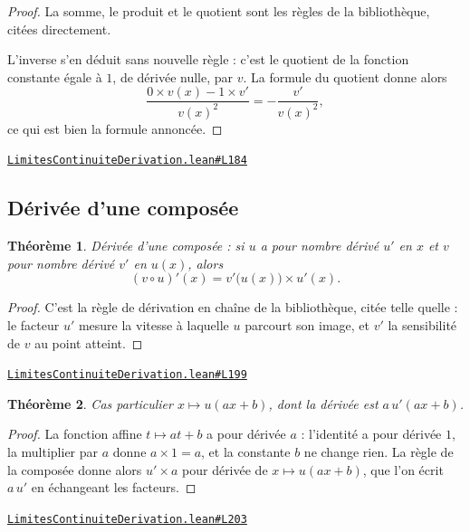\documentclass[11pt,a4paper]{article}
\theoremstyle{definition}
\theoremstyle{plain}
\newtheorem{theoreme}{Théorème}
\newcommand{\source}[2]{\par\smallskip\noindent\hfill{\footnotesize\href{#1}{\texttt{#2}}}\par\smallskip}
\begin{document}
\begin{proof}
La somme, le produit et le quotient sont les règles de la bibliothèque, citées
directement.

L'inverse s'en déduit sans nouvelle règle : c'est le quotient de la fonction constante
égale à $1$, de dérivée nulle, par $v$. La formule du quotient donne alors
\[ \frac{0 \times v(x) - 1 \times v'}{v(x)^{2}} = -\frac{v'}{v(x)^{2}} , \]
ce qui est bien la formule annoncée.
\end{proof}
\source{https://github.com/Commutator-IO/learn-lean/blob/main/cours/02-lycee/04-limites-continuite-derivation/LimitesContinuiteDerivation.lean\#L184}{LimitesContinuiteDerivation.lean\#L184}

\subsection{Dérivée d'une composée}

\begin{theoreme}
Dérivée d'une composée : si $u$ a pour nombre dérivé $u'$ en $x$ et $v$ pour nombre
dérivé $v'$ en $u(x)$, alors
\[ (v \circ u)'(x) = v'\bigl(u(x)\bigr) \times u'(x) . \]
\end{theoreme}

\begin{proof}
C'est la règle de dérivation en chaîne de la bibliothèque, citée telle quelle : le facteur
$u'$ mesure la vitesse à laquelle $u$ parcourt son image, et $v'$ la sensibilité de $v$ au
point atteint.
\end{proof}
\source{https://github.com/Commutator-IO/learn-lean/blob/main/cours/02-lycee/04-limites-continuite-derivation/LimitesContinuiteDerivation.lean\#L199}{LimitesContinuiteDerivation.lean\#L199}

\begin{theoreme}
Cas particulier $x \mapsto u(ax + b)$, dont la dérivée est $a\,u'(ax + b)$.
\end{theoreme}

\begin{proof}
La fonction affine $t \mapsto at + b$ a pour dérivée $a$ : l'identité a pour dérivée $1$,
la multiplier par $a$ donne $a \times 1 = a$, et la constante $b$ ne change rien. La règle
de la composée donne alors $u' \times a$ pour dérivée de $x \mapsto u(ax + b)$, que l'on
écrit $a\,u'$ en échangeant les facteurs.
\end{proof}
\source{https://github.com/Commutator-IO/learn-lean/blob/main/cours/02-lycee/04-limites-continuite-derivation/LimitesContinuiteDerivation.lean\#L203}{LimitesContinuiteDerivation.lean\#L203}
\end{document}
